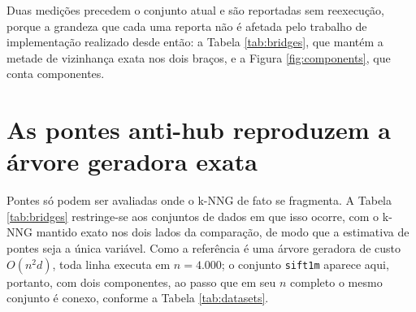 Duas medições precedem o conjunto atual e são reportadas sem reexecução, porque a grandeza que cada uma reporta não é afetada pelo trabalho de implementação realizado desde então: a Tabela \ref{tab:bridges}, que mantém a metade de vizinhança exata nos dois braços, e a Figura \ref{fig:components}, que conta componentes.\\

\section{As pontes anti-hub reproduzem a árvore geradora exata\label{sec:res-bridges}}

Pontes só podem ser avaliadas onde o \ac{k-NNG} de fato se fragmenta. A Tabela \ref{tab:bridges} restringe-se aos conjuntos de dados em que isso ocorre, com o \ac{k-NNG} mantido exato nos dois lados da comparação, de modo que a estimativa de pontes seja a única variável. Como a referência é uma árvore geradora de custo $O(n^2 d)$, toda linha executa em $n = 4.000$; o conjunto \texttt{sift1m} aparece aqui, portanto, com dois componentes, ao passo que em seu $n$ completo o mesmo conjunto é conexo, conforme a Tabela \ref{tab:datasets}.\\

